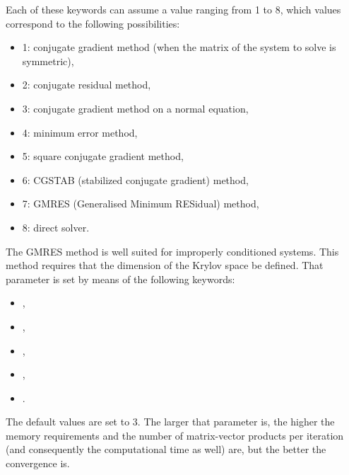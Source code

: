 Each of these keywords can assume a value ranging from 1 to 8, which values
correspond to the following possibilities:

\begin{itemize}
\item 1: conjugate gradient method (when the matrix of the system to solve
is symmetric),

\item 2: conjugate residual method,

\item 3: conjugate gradient method on a normal equation,

\item 4: minimum error method,

\item 5: square conjugate gradient method,

\item 6: CGSTAB (stabilized conjugate gradient) method,

\item 7: GMRES (Generalised Minimum RESidual) method,

\item 8: direct solver.
\end{itemize}

The GMRES method is well suited for improperly conditioned systems. This method
requires that the dimension of the Krylov space be defined. That parameter is
set by means of the following keywords:

\begin{itemize}
\item {},

\item {},

\item {},

\item {},

\item {}.
\end{itemize}

The default values are set to 3. The larger that parameter is, the higher the
memory requirements and the number of matrix-vector products per iteration (and
consequently the computational time as well) are, but the better the
convergence is.

